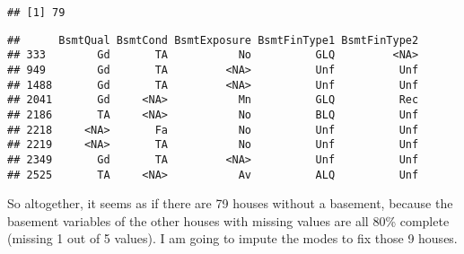 \documentclass[]{article}
\newenvironment{Shaded}{\begin{snugshade}}{\end{snugshade}}
\newcommand{\KeywordTok}[1]{\textcolor[rgb]{0.13,0.29,0.53}{\textbf{#1}}}
\newcommand{\StringTok}[1]{\textcolor[rgb]{0.31,0.60,0.02}{#1}}
\newcommand{\CommentTok}[1]{\textcolor[rgb]{0.56,0.35,0.01}{\textit{#1}}}
\newcommand{\OperatorTok}[1]{\textcolor[rgb]{0.81,0.36,0.00}{\textbf{#1}}}
\newcommand{\NormalTok}[1]{#1}
\begin{document}
\begin{verbatim}
## [1] 79
\end{verbatim}

\begin{Shaded}
\end{Shaded}

\begin{verbatim}
##      BsmtQual BsmtCond BsmtExposure BsmtFinType1 BsmtFinType2
## 333        Gd       TA           No          GLQ         <NA>
## 949        Gd       TA         <NA>          Unf          Unf
## 1488       Gd       TA         <NA>          Unf          Unf
## 2041       Gd     <NA>           Mn          GLQ          Rec
## 2186       TA     <NA>           No          BLQ          Unf
## 2218     <NA>       Fa           No          Unf          Unf
## 2219     <NA>       TA           No          Unf          Unf
## 2349       Gd       TA         <NA>          Unf          Unf
## 2525       TA     <NA>           Av          ALQ          Unf
\end{verbatim}

So altogether, it seems as if there are 79 houses without a basement,
because the basement variables of the other houses with missing values
are all 80\% complete (missing 1 out of 5 values). I am going to impute
the modes to fix those 9 houses.
\end{document}
